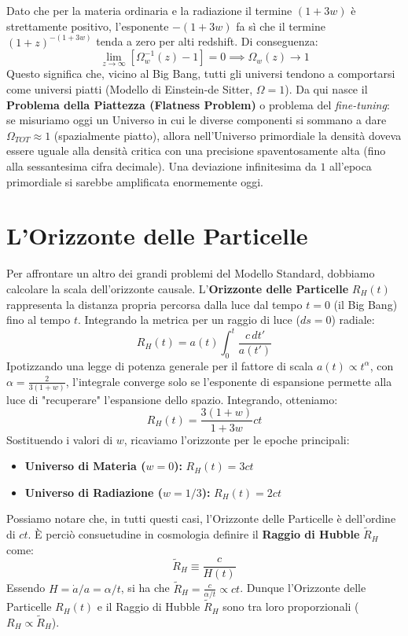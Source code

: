 \documentclass[11pt,a4paper]{report}
\begin{document}
Dato che per la materia ordinaria e la radiazione il termine $(1+3w)$ è strettamente positivo, l'esponente $-(1+3w)$ fa sì che il termine $(1+z)^{-(1+3w)}$ tenda a zero per alti redshift. Di conseguenza:
\begin{equation}
\lim_{z \to \infty} \left[ \Omega_w^{-1}(z) - 1 \right] = 0 \implies \Omega_w(z) \to 1
\end{equation}
Questo significa che, vicino al Big Bang, tutti gli universi tendono a comportarsi come universi piatti (Modello di Einstein-de Sitter, $\Omega=1$).
Da qui nasce il \textbf{Problema della Piattezza (Flatness Problem)} o problema del \textit{fine-tuning}: se misuriamo oggi un Universo in cui le diverse componenti si sommano a dare $\Omega_{TOT} \approx 1$ (spazialmente piatto), allora nell'Universo primordiale la densità doveva essere uguale alla densità critica con una precisione spaventosamente alta (fino alla sessantesima cifra decimale). Una deviazione infinitesima da $1$ all'epoca primordiale si sarebbe amplificata enormemente oggi.

\section{L'Orizzonte delle Particelle}

Per affrontare un altro dei grandi problemi del Modello Standard, dobbiamo calcolare la scala dell'orizzonte causale. L'\textbf{Orizzonte delle Particelle} $R_H(t)$ rappresenta la distanza propria percorsa dalla luce dal tempo $t=0$ (il Big Bang) fino al tempo $t$. Integrando la metrica per un raggio di luce ($ds=0$) radiale:
\begin{equation}
R_H(t) = a(t) \int_0^t \frac{c \, dt'}{a(t')}
\end{equation}
Ipotizzando una legge di potenza generale per il fattore di scala $a(t) \propto t^\alpha$, con $\alpha = \frac{2}{3(1+w)}$, l'integrale converge solo se l'esponente di espansione permette alla luce di "recuperare" l'espansione dello spazio. Integrando, otteniamo:
\begin{equation}
R_H(t) = \frac{3(1+w)}{1+3w} c t
\end{equation}
Sostituendo i valori di $w$, ricaviamo l'orizzonte per le epoche principali:
\begin{itemize}
    \item \textbf{Universo di Materia ($w=0$):} $R_H(t) = 3 c t$
    \item \textbf{Universo di Radiazione ($w=1/3$):} $R_H(t) = 2 c t$
\end{itemize}
Possiamo notare che, in tutti questi casi, l'Orizzonte delle Particelle è dell'ordine di $ct$. È perciò consuetudine in cosmologia definire il \textbf{Raggio di Hubble} $\tilde{R}_H$ come:
\begin{equation}
\tilde{R}_H \equiv \frac{c}{H(t)}
\end{equation}
Essendo $H = \dot{a}/a = \alpha/t$, si ha che $\tilde{R}_H = \frac{c}{\alpha/t} \propto ct$. Dunque l'Orizzonte delle Particelle $R_H(t)$ e il Raggio di Hubble $\tilde{R}_H$ sono tra loro proporzionali ($R_H \propto \tilde{R}_H$).
\end{document}
